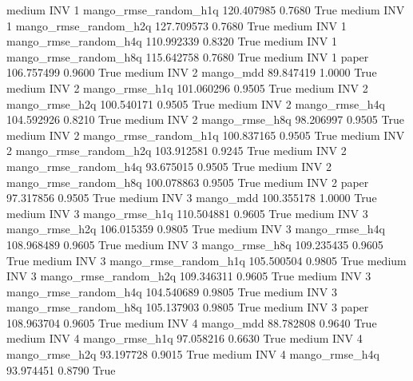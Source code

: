     medium      INV                 1 mango_rmse_random_h1q 120.407985      0.7680    True
    medium      INV                 1 mango_rmse_random_h2q 127.709573      0.7680    True
    medium      INV                 1 mango_rmse_random_h4q 110.992339      0.8320    True
    medium      INV                 1 mango_rmse_random_h8q 115.642758      0.7680    True
    medium      INV                 1                 paper 106.757499      0.9600    True
    medium      INV                 2             mango_mdd  89.847419      1.0000    True
    medium      INV                 2        mango_rmse_h1q 101.060296      0.9505    True
    medium      INV                 2        mango_rmse_h2q 100.540171      0.9505    True
    medium      INV                 2        mango_rmse_h4q 104.592926      0.8210    True
    medium      INV                 2        mango_rmse_h8q  98.206997      0.9505    True
    medium      INV                 2 mango_rmse_random_h1q 100.837165      0.9505    True
    medium      INV                 2 mango_rmse_random_h2q 103.912581      0.9245    True
    medium      INV                 2 mango_rmse_random_h4q  93.675015      0.9505    True
    medium      INV                 2 mango_rmse_random_h8q 100.078863      0.9505    True
    medium      INV                 2                 paper  97.317856      0.9505    True
    medium      INV                 3             mango_mdd 100.355178      1.0000    True
    medium      INV                 3        mango_rmse_h1q 110.504881      0.9605    True
    medium      INV                 3        mango_rmse_h2q 106.015359      0.9805    True
    medium      INV                 3        mango_rmse_h4q 108.968489      0.9605    True
    medium      INV                 3        mango_rmse_h8q 109.235435      0.9605    True
    medium      INV                 3 mango_rmse_random_h1q 105.500504      0.9805    True
    medium      INV                 3 mango_rmse_random_h2q 109.346311      0.9605    True
    medium      INV                 3 mango_rmse_random_h4q 104.540689      0.9805    True
    medium      INV                 3 mango_rmse_random_h8q 105.137903      0.9805    True
    medium      INV                 3                 paper 108.963704      0.9605    True
    medium      INV                 4             mango_mdd  88.782808      0.9640    True
    medium      INV                 4        mango_rmse_h1q  97.058216      0.6630    True
    medium      INV                 4        mango_rmse_h2q  93.197728      0.9015    True
    medium      INV                 4        mango_rmse_h4q  93.974451      0.8790    True
